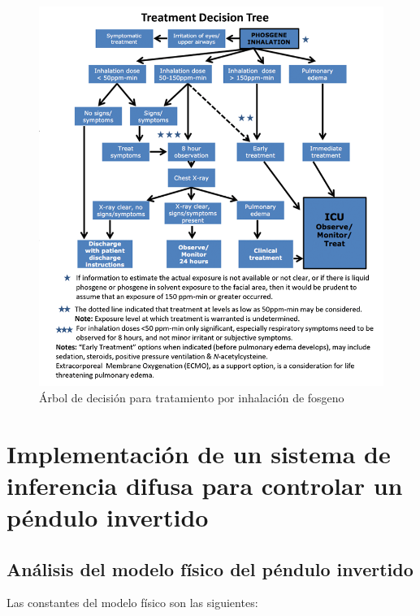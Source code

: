 \documentclass[onecolumn]{article}
\begin{document}
\begin{figure}
\centering
\includegraphics{treatment_decision_tree.png}
\caption{Árbol de decisión para tratamiento por inhalación de fosgeno}
\end{figure}

\hypertarget{implementaciuxf3n-de-un-sistema-de-inferencia-difusa-para-controlar-un-puxe9ndulo-invertido}{%
\section{Implementación de un sistema de inferencia difusa para
controlar un péndulo
invertido}\label{implementaciuxf3n-de-un-sistema-de-inferencia-difusa-para-controlar-un-puxe9ndulo-invertido}}

\hypertarget{anuxe1lisis-del-modelo-fuxedsico-del-puxe9ndulo-invertido}{%
\subsection{Análisis del modelo físico del péndulo
invertido}\label{anuxe1lisis-del-modelo-fuxedsico-del-puxe9ndulo-invertido}}

Las constantes del modelo físico son las siguientes:
\end{document}
